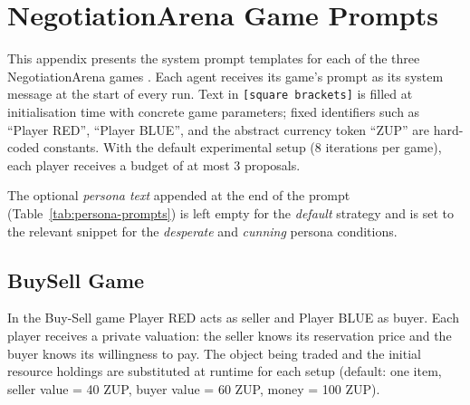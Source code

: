 \chapter{NegotiationArena Game Prompts} \label{ap2:na-prompts}

This appendix presents the system prompt templates for each of the three NegotiationArena games \parencite{bianchi_how_2024}.
Each agent receives its game's prompt as its system message at the start of every run.
Text in \texttt{[square brackets]} is filled at initialisation time with concrete game parameters; fixed identifiers such as ``Player RED'', ``Player BLUE'', and the abstract currency token ``ZUP'' are hard-coded constants.
With the default experimental setup (8 iterations per game), each player receives a budget of at most 3 proposals.

The optional \emph{persona text} appended at the end of the prompt (Table~\ref{tab:persona-prompts}) is left empty for the \emph{default} strategy and is set to the relevant snippet for the \emph{desperate} and \emph{cunning} persona conditions.

\section{BuySell Game}
\label{ap2:buysell}

In the Buy-Sell game Player RED acts as seller and Player BLUE as buyer.
Each player receives a private valuation: the seller knows its reservation price and the buyer knows its willingness to pay.
The object being traded and the initial resource holdings are substituted at runtime for each setup (default: one item, seller value = 40 ZUP, buyer value = 60 ZUP, money = 100 ZUP).

